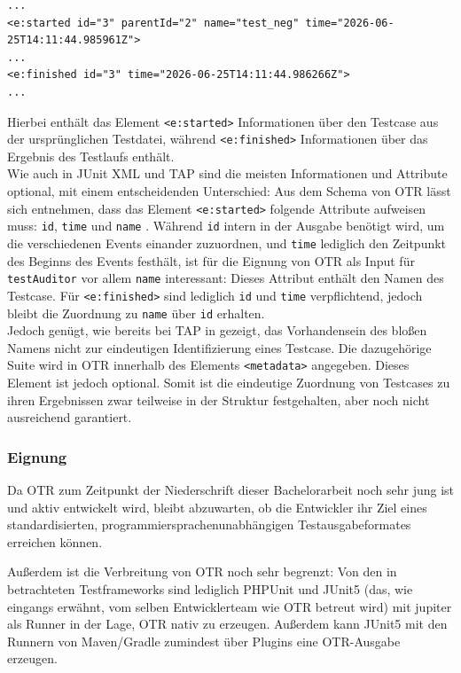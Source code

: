\begin{lstlisting}[caption={OTR von \texttt{test\_neg}, erzeugt durch PHPUnit.\\ ''\textellipsis{}'' bezeichnet gekürzte Stellen.}, label={OTR_example}]
...
<e:started id="3" parentId="2" name="test_neg" time="2026-06-25T14:11:44.985961Z">
...
<e:finished id="3" time="2026-06-25T14:11:44.986266Z">
...
\end{lstlisting}
Hierbei enthält das Element \texttt{<e:started>} Informationen über den Testcase aus der ursprünglichen Testdatei, während \texttt{<e:finished>} Informationen über das Ergebnis des Testlaufs enthält.\\
Wie auch in JUnit XML und TAP sind die meisten Informationen und Attribute optional, mit einem entscheidenden Unterschied: Aus dem Schema von OTR lässt sich entnehmen, dass das Element \texttt{<e:started>} folgende Attribute aufweisen muss: \texttt{id}, \texttt{time} und \texttt{name} \cite{OTR_README}. Während \texttt{id} intern in der Ausgabe benötigt wird, um die verschiedenen Events einander zuzuordnen, und \texttt{time} lediglich den Zeitpunkt des Beginns des Events festhält, ist für die Eignung von OTR als Input für \texttt{testAuditor} vor allem \texttt{name} interessant: Dieses Attribut enthält den Namen des Testcase. Für \texttt{<e:finished>} sind lediglich \texttt{id} und \texttt{time} verpflichtend, jedoch bleibt die Zuordnung zu \texttt{name} über \texttt{id} erhalten.\\
Jedoch genügt, wie bereits bei TAP in  gezeigt, das Vorhandensein des bloßen Namens nicht zur eindeutigen Identifizierung eines Testcase. Die dazugehörige Suite wird in OTR innerhalb des Elements \texttt{<metadata>} angegeben. Dieses Element ist jedoch optional. Somit ist die eindeutige Zuordnung von Testcases zu ihren Ergebnissen zwar teilweise in der Struktur festgehalten, aber noch nicht ausreichend garantiert. 

\subsubsection{Eignung}
Da OTR zum Zeitpunkt der Niederschrift dieser Bachelorarbeit noch sehr jung ist und aktiv entwickelt wird, bleibt abzuwarten, ob die Entwickler ihr Ziel eines standardisierten, programmiersprachenunabhängigen Testausgabeformates erreichen können.

Außerdem ist die Verbreitung von OTR noch sehr begrenzt: Von den in  betrachteten Testframeworks sind lediglich PHPUnit und JUnit5 (das, wie eingangs erwähnt, vom selben Entwicklerteam wie OTR betreut wird) mit jupiter als Runner in der Lage, OTR nativ zu erzeugen. Außerdem kann JUnit5 mit den Runnern von Maven/Gradle zumindest über Plugins eine OTR-Ausgabe erzeugen.

